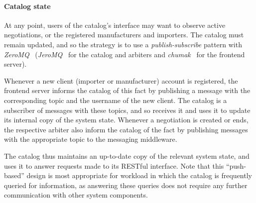 \paragraph{Catalog state}

At any point, users of the catalog's interface may want to observe active negotiations, or the registered manufacturers and importers. The catalog must remain updated, and so the strategy is to use a \emph{publish-subscribe} pattern with \emph{ZeroMQ}~\cite{website:zeromq} (\emph{JeroMQ}~\cite{website:jeromq} for the catalog and arbiters and \emph{chumak}~\cite{website:chumak} for the frontend server).

Whenever a new client (importer or manufacturer) account is registered, the frontend server informs the catalog of this fact by publishing a message with the corresponding topic and the username of the new client.
The catalog is a subscriber of messages with these topics, and so receives it and uses it to update its internal copy of the system state.
Whenever a negotiation is created or ends, the respective arbiter also inform the catalog of the fact by publishing messages with the appropriate topic to the messaging middleware.

The catalog thus maintains an up-to-date copy of the relevant system state, and uses it to answer requests made to its RESTful interface.
Note that this ``push-based'' design is most appropriate for workload in which the catalog is frequently queried for information, as answering these queries does not require any further communication with other system components.





